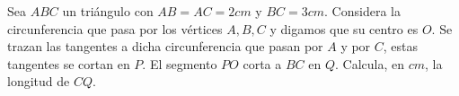 Sea $ABC$ un triángulo con $AB = AC = 2cm$ y $BC = 3cm$. Considera la circunferencia que pasa por los vértices $A,B,C$ y digamos que su centro es $O$. Se trazan las tangentes a dicha circunferencia que pasan por $A$ y por $C$, estas tangentes se cortan en $P$. El segmento $PO$ corta a $BC$ en $Q$. Calcula, en $cm$, la longitud de $CQ$.